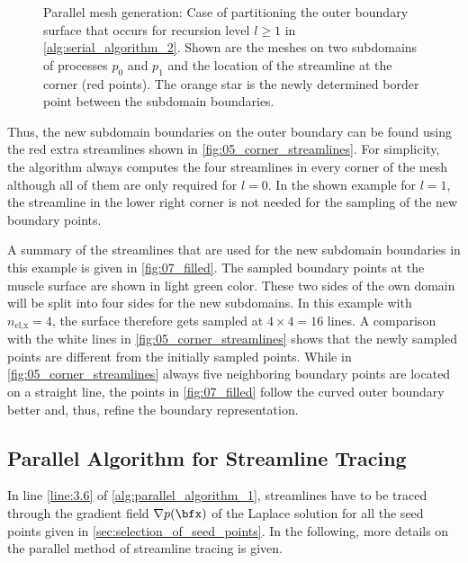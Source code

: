 \begin{figure}
  \centering
  \def\svgwidth{0.7\textwidth}
  
  \caption{Parallel mesh generation: Case of partitioning the outer boundary surface that occurs for recursion level $l \geq 1$ in \cref{alg:serial_algorithm_2}. Shown are the meshes on two subdomains of processes $p_0$ and $p_1$ and the location of the streamline at the corner (red points). The orange star is the newly determined border point between the subdomain boundaries.}
  \label{fig:seed_points_case_2}%
\end{figure}

Thus, the new subdomain boundaries on the outer boundary can be found using the red extra streamlines shown in \cref{fig:05_corner_streamlines}.
For simplicity, the algorithm always computes the four streamlines in every corner of the mesh although all of them are only required for $l=0$. In the shown example for $l=1$, the streamline in the lower right corner is not needed for the sampling of the new boundary points. 

A summary of the streamlines that are used for the new subdomain boundaries in this example is given in \cref{fig:07_filled}.
The sampled boundary points at the muscle surface are shown in light green color. These two sides of the own domain will be split into four sides for the new subdomains. In this example with $n_\text{el,x}=4$, the surface therefore gets sampled at $4\times 4=16$ lines. A comparison with the white lines in \cref{fig:05_corner_streamlines} shows that the newly sampled points are different from the initially sampled points. While in  \cref{fig:05_corner_streamlines} always five neighboring boundary points are located on a straight line, the points in \cref{fig:07_filled} follow the curved outer boundary better and, thus, refine the boundary representation.

\subsection{Parallel Algorithm for Streamline Tracing}\label{sec:parallel_streamline_tracing}

In line \ref{line:3.6} of \cref{alg:parallel_algorithm_1}, streamlines have to be traced through the gradient field $\nabla p(\bfx)$ of the Laplace solution for all the seed points given in \cref{sec:selection_of_seed_points}. In the following, more details on the parallel method of streamline tracing is given.


